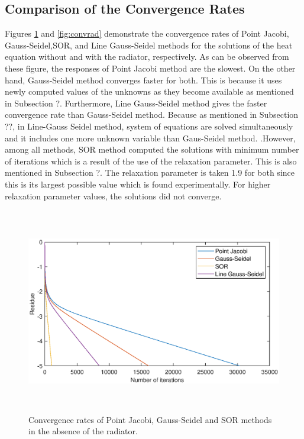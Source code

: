 \documentclass[letterpaper,12pt]{article}
\begin{document}
\subsection{Comparison of the Convergence Rates}
Figures \ref{fig:convnorad} and \ref{fig:convrad} demonstrate the convergence rates of Point
Jacobi, Gauss-Seidel,SOR, and Line Gauss-Seidel methods for the solutions of the heat equation without and with
the radiator, respectively. As can be observed from these figure, the responses of Point Jacobi
method are the slowest. On the other hand, Gauss-Seidel method converges faster for both.
This is because it uses newly computed values of the unknowns as they become available as 
mentioned in Subsection ?. Furthermore, Line Gauss-Seidel method gives the faster convergence
rate than Gauss-Seidel method. Because as mentioned in Subsection ??, in Line-Gauss Seidel method,
system of equations are solved simultaneously and it includes one more unknown variable than Gaus-Seidel method.
.However, among all methods, SOR method computed the solutions with minimum number
of iterations which is a result of the use of the relaxation parameter. This is also mentioned
in Subsection ?. The relaxation parameter is taken 1.9 for both since this is its largest
possible value which is found experimentally. For higher relaxation parameter values, the
solutions did not converge.

\begin{figure}[H] 
	\centering 
	\includegraphics[max height=9cm]{graphs/residual_SOR19_norad.eps}
	\caption{Convergence rates of Point Jacobi, Gauss-Seidel and SOR methods in the absence of the radiator.}
 	\label{fig:convnorad}
\end{figure}
\end{document}

